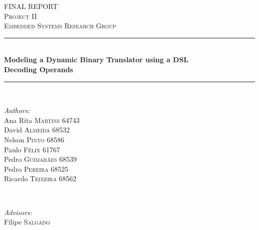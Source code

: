 \documentclass[12pt]{article}
\begin{document}
\begin{titlepage}

\newcommand{\HRule}{\rule{\linewidth}{0.5mm}} %

\center %
 

\textsc{\LARGE FINAL REPORT}\\[1.0cm] %
\textsc{\Large Project II}\\[0.5cm] %
\textsc{\large Embedded Systems Research Group}\\[0.5cm] %


\HRule \\[1.2cm]
{ \Huge \bfseries 
Modeling a Dynamic Binary Translator using a DSL}\\[1.0cm] %
{ \Large \bfseries 
Decoding Operands}\\[0.4cm]

\HRule \\[2.0cm]
 
\begin{minipage}{0.4\textwidth}
\begin{flushleft} \large
\emph{Authors:}\\
Ana Rita \textsc{Martins} 64743 \\
David \textsc{Almeida} 68532 \\
Nelson \textsc{Pinto} 68586 \\
Paulo \textsc{Félix} 61767  \\
Pedro \textsc{Guimarães} 68539 \\
Pedro \textsc{Pereira} 68525 \\
Ricardo \textsc{Teixeira} 68562

\end{flushleft}
\end{minipage}
~
\begin{minipage}{0.4\textwidth}
\begin{flushright} \large
 \emph{Advisors:} \\
Filipe \textsc{Salgado} \\ %
\end{flushright}
\end{minipage}\\[2cm]


\end{titlepage}
\end{document}
